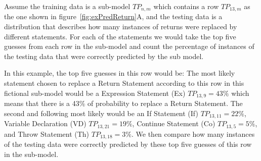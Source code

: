 \documentclass[conference]{IEEEtran}
\begin{document}
Assume the training data is a sub-model $TP_{n,m}$ which contains a row 
$TP_{13,m}$ as the one shown in figure~\ref{fig:exPredReturn}A, and the testing data is a distribution that describes 
how many instances of returns were replaced by different statements.
For each of the statements we would take the top five guesses from each row in 
the sub-model and count the percentage of instances of the testing data that were correctly 
predicted by the sub model. 

In this example, the top five guesses in this row would be: The most 
likely statement chosen to replace a Return Statement according to this row in 
this fictional sub-model would be a Expression Statement (Ex) $TP_{13,9} = 43\%$ 
which means that there is a 43\% of probability to replace a Return Statement. 
The second and following most likely would be an If Statement (If) $TP_{13,11} = 22\%$, Variable Declaration (VD)  $TP_{13,21} = 19\%$, 
Continue Statement (Co)  $TP_{13,5} = 5\%$, and Throw Statement (Th) $TP_{13,18} = 3\%$. We then compare how many instances of the testing data were correctly predicted 
by these top five guesses of this row in the sub-model. 

\end{document}
